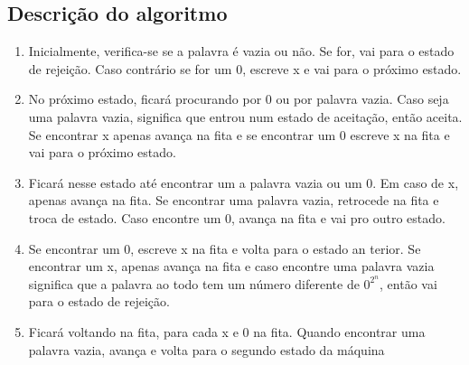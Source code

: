 \documentclass{article}
\begin{document}
    \subsection{Descrição do algoritmo}
    \begin{enumerate}
        \item Inicialmente, verifica-se se a palavra é vazia ou não.
        Se for, vai para o estado de rejeição. Caso contrário se for
        um 0, escreve x e vai para o próximo estado.
        \item No próximo estado, ficará procurando por 0 ou por palavra
        vazia. Caso seja uma palavra vazia, significa que entrou num estado
        de aceitação, então aceita. Se encontrar x apenas avança na fita
        e se encontrar um 0 escreve x na fita e vai para o próximo estado.
        \item Ficará nesse estado até encontrar um a palavra vazia ou 
        um 0. Em caso de x, apenas avança na fita. Se encontrar uma palavra
        vazia, retrocede na fita e troca de estado. Caso encontre um 0,
        avança na fita e vai pro outro estado.
        \item Se encontrar um 0, escreve x na fita e volta para o estado an
        terior. Se encontrar um x, apenas avança na fita e caso encontre
        uma palavra vazia significa que a palavra ao todo tem um número
        diferente de $0^{2}^{n}$, então vai para o estado de rejeição.
        \item Ficará voltando na fita, para cada x e 0 na fita. Quando
        encontrar uma palavra vazia, avança e volta para o segundo 
        estado da máquina
    \end{enumerate}
\end{document}
